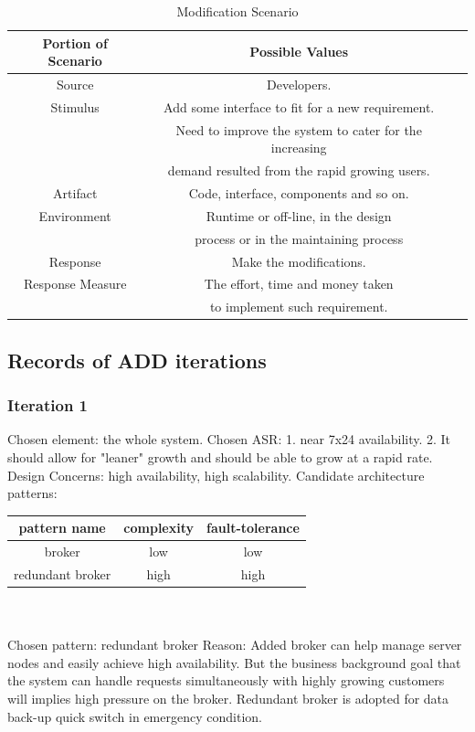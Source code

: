 \documentclass{article}
\begin{document}
	\begin{center}
		\begin{table}[!htb]
		\begin{tabular}{ccc}
		\toprule  
		Portion of Scenario & Possible Values\\
		\midrule 
		Source & Developers.\\
		Stimulus & Add some interface to fit for a new requirement.\\
		& Need to improve the system to cater for the increasing \\
		& demand resulted from the rapid growing users.\\
		Artifact & Code, interface, components and so on.\\
		Environment & Runtime or off-line, in the design \\
		& process or in the maintaining process\\
		Response & Make the modifications.\\
		Response Measure & The effort, time and money taken\\
		& to implement such requirement.\\
		\bottomrule
		\end{tabular}
		\caption{Modification Scenario}
		\end{table}
	\end{center}

	


	\subsection{Records of ADD iterations}
		\subsubsection{Iteration 1}
		Chosen element: the whole system.
		Chosen ASR: 
		1. near 7x24 availability.
		2. It should allow for "leaner" growth and should be able to grow at a rapid rate.
		Design Concerns: high  availability, high scalability.
		Candidate architecture patterns:\\

		\begin{tabular}{|c|c|c|}
			\hline
			pattern name & complexity& fault-tolerance\\
			\hline
			broker& low& low\\
			\hline
			redundant broker& high& high\\
			\hline
		\end{tabular}
		\\\\
		Chosen pattern: redundant broker
		Reason: Added broker can help manage server nodes and easily achieve high availability. But the business background goal that the system can handle requests simultaneously with highly growing customers will implies high pressure on the broker. Redundant broker is adopted for data back-up quick switch in emergency condition. 
\end{document}
